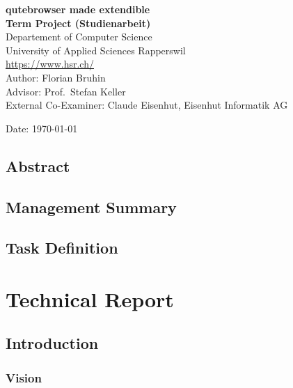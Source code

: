 \documentclass[a4paper,parskip=full]{scrreprt}
\begin{document}
\begin{titlepage}
\begin{flushleft}
{\huge \bfseries qutebrowser made extendible}\\[0.5cm]
{\large \bfseries Term Project (Studienarbeit)}\\[2cm]

Departement of Computer Science\\
University of Applied Sciences Rapperswil\\
\url{https://www.hsr.ch/}\\[1cm]

Author: Florian Bruhin\\[0.3cm]
Advisor: Prof.~Stefan Keller\\[0.3cm]
External Co-Examiner: Claude Eisenhut, Eisenhut Informatik AG

\vfill
Date: {\today}

\end{flushleft}

\end{titlepage}



\chapter*{Abstract}

\chapter*{Management Summary}


\tableofcontents
\listoffigures
\listoftables


\chapter*{Task Definition}  

\part{Technical Report}

\chapter{Introduction}
\section{Vision}
\end{document}
